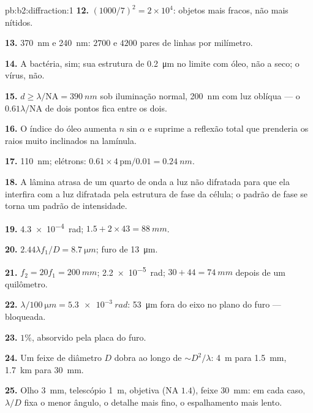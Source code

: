 \begin{solution}{pb:b2:diffraction:1}
\textbf{12.} $(1000/7)^2 = 2 \times 10^4$: objetos mais fracos, não mais nítidos.

\textbf{13.} \qty{370}{nm} e \qty{240}{nm}: $2700$ e $4200$ pares de linhas por
milímetro.

\textbf{14.} A bactéria, sim; sua estrutura de \qty{0.2}{\micro m} no limite
com óleo, não a seco; o vírus, não.

\textbf{15.} $d \ge \lambda/\mathrm{NA} = \qty{390}{nm}$ sob iluminação normal, \qty{200}{nm}
com luz oblíqua --- o $0.61\lambda/\mathrm{NA}$ de dois pontos fica entre os dois.

\textbf{16.} O índice do óleo aumenta $n\sin\alpha$ e suprime a reflexão
total que prenderia os raios muito inclinados na lamínula.

\textbf{17.} \qty{110}{nm}; elétrons: $0.61 \times 4\,\text{pm}/0.01 = \qty{0.24}{nm}$.

\textbf{18.} A lâmina atrasa de um quarto de onda a luz não difratada
para que ela interfira com a luz difratada pela estrutura de fase da
célula; o padrão de fase se torna um padrão de intensidade.

\textbf{19.} \qty{4.3e-4}{rad}; $1.5 + 2 \times 43 = \qty{88}{mm}$.

\textbf{20.} $2.44\lambda f_1/D = \qty{8.7}{\micro m}$; furo de \qty{13}{\micro m}.

\textbf{21.} $f_2 = 20f_1 = \qty{200}{mm}$; \qty{2.2e-5}{rad}; $30 + 44 = \qty{74}{mm}$ depois de um
quilômetro.

\textbf{22.} $\lambda/\qty{100}{\micro m} = \qty{5.3e-3}{rad}$: \qty{53}{\micro m} fora do eixo no
plano do furo --- bloqueada.

\textbf{23.} $1\%$, absorvido pela placa do furo.

\textbf{24.} Um feixe de diâmetro $D$ dobra ao longo de $\sim D^2/\lambda$: \qty{4}{m} para
\qty{1.5}{mm}, \qty{1.7}{km} para \qty{30}{mm}.

\textbf{25.} Olho \qty{3}{mm}, telescópio \qty{1}{m}, objetiva (NA $1.4$), feixe
\qty{30}{mm}: em cada caso, $\lambda/D$ fixa o menor ângulo, o detalhe mais fino, o
espalhamento mais lento.
\end{solution}

